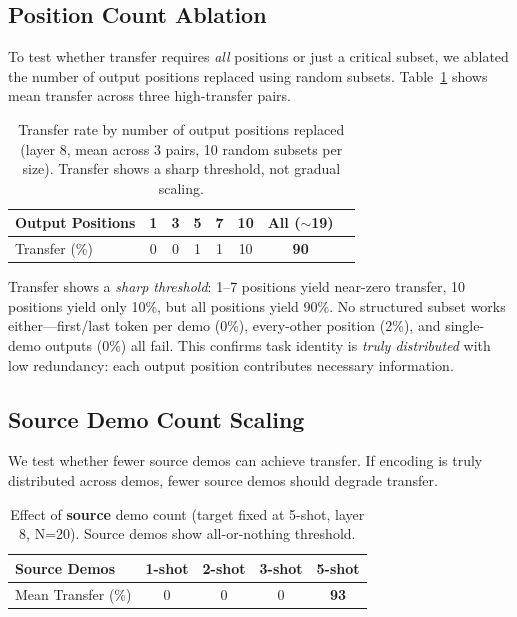 \documentclass[runningheads]{llncs}
\begin{document}
\subsection{Position Count Ablation}

To test whether transfer requires \emph{all} positions or just a critical subset, we ablated the number of output positions replaced using random subsets. Table~\ref{tab:position_count} shows mean transfer across three high-transfer pairs.

\begin{table}[h]
\centering
\caption{Transfer rate by number of output positions replaced (layer 8, mean across 3 pairs, 10 random subsets per size). Transfer shows a sharp threshold, not gradual scaling.}
\label{tab:position_count}
\begin{tabular}{@{}lccccccc@{}}
\toprule
Output Positions & 1 & 3 & 5 & 7 & 10 & All ($\sim$19) \\
\midrule
Transfer (\%) & 0 & 0 & 1 & 1 & 10 & \textbf{90} \\
\bottomrule
\end{tabular}
\end{table}

Transfer shows a \emph{sharp threshold}: 1--7 positions yield near-zero transfer, 10 positions yield only 10\%, but all positions yield 90\%. No structured subset works either---first/last token per demo (0\%), every-other position (2\%), and single-demo outputs (0\%) all fail. This confirms task identity is \emph{truly distributed} with low redundancy: each output position contributes necessary information.

\subsection{Source Demo Count Scaling}

We test whether fewer source demos can achieve transfer. If encoding is truly distributed across demos, fewer source demos should degrade transfer.

\begin{table}[h]
\centering
\caption{Effect of \textbf{source} demo count (target fixed at 5-shot, layer 8, N=20). Source demos show all-or-nothing threshold.}
\label{tab:source_demos}
\begin{tabular}{@{}lcccc@{}}
\toprule
Source Demos & 1-shot & 2-shot & 3-shot & 5-shot \\
\midrule
Mean Transfer (\%) & 0 & 0 & 0 & \textbf{93} \\
\bottomrule
\end{tabular}
\end{table}
\end{document}
